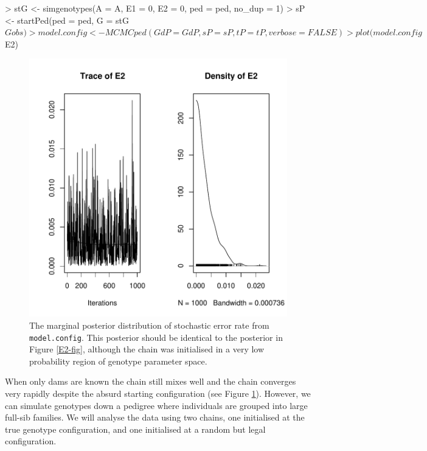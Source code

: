 \documentclass{article}
\begin{document}
\begin{Schunk}
\begin{Sinput}
> stG <- simgenotypes(A = A, E1 = 0, E2 = 0, ped = ped, no_dup = 1)
> sP <- startPed(ped = ped, G = stG$Gobs)
> model.config <- MCMCped(GdP = GdP, sP = sP, tP = tP, verbose = FALSE)
> plot(model.config$E2)
\end{Sinput}
\end{Schunk}



\begin{figure}[!h]
\begin{center}
\includegraphics{Tutorial-048}
\end{center}
\caption{The marginal posterior distribution of stochastic error rate from \texttt{model.config}. This posterior should be identical to the posterior in Figure \ref{E2-fig}, although the chain was initialised in a very low probability region of genotype parameter space.}
\label{E2con-fig}
\end{figure}

When only dams are known the chain still mixes well and the chain converges very rapidly despite the absurd starting configuration (see Figure \ref{E2con-fig}).  However, we can simulate genotypes down a pedigree where individuals are grouped into large full-sib families. We will analyse the data using two chains, one initialised at the true genotype configuration, and one initialised at a random but legal configuration.
\end{document}
